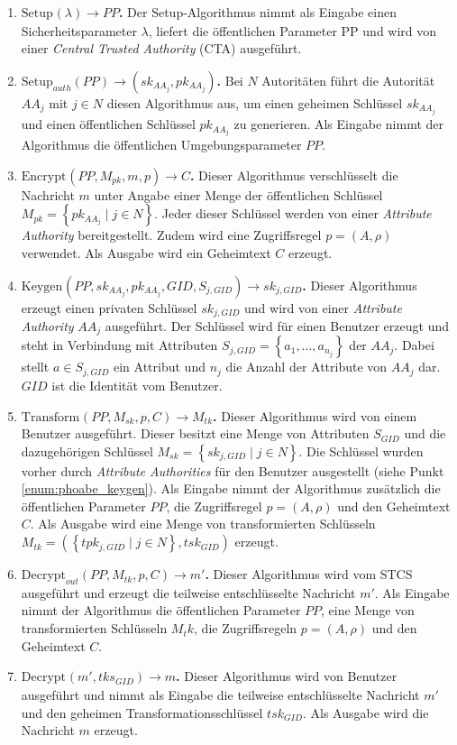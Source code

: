 \documentclass{hsflensburg}
\newcommand{\algitem}[4]{\textbf{$\text{#1}_{#2}\left({#3}\right) \to {#4}$.}\;\;\;\;}
\begin{document}
	\newpage
	\begin{enumerate}
		\item \algitem{Setup}{}{\lambda}{PP} Der
			Setup-Algorithmus nimmt als Eingabe einen Sicherheitsparameter $\lambda$,
			liefert die öffentlichen Parameter $\text{PP}$ und wird von einer
			\textit{Central Trusted Authority} (CTA) ausgeführt.
		\item \algitem{Setup}{auth}{PP}{\left(sk_{AA_j}, pk_{AA_j}\right)} Bei $N$
			Autoritäten führt die Autorität $AA_j$ mit $j \in N$ diesen Algorithmus
			aus, um einen geheimen Schlüssel $sk_{AA_j}$ und einen öffentlichen
			Schlüssel $pk_{AA_j}$ zu generieren. Als Eingabe nimmt der Algorithmus die
			öffentlichen Umgebungsparameter $PP$.
		\item \algitem{Encrypt}{}{PP, M_{pk}, m, p}{C} Dieser Algorithmus
			ver\-schlüs\-selt die Nachricht $m$ unter Angabe einer Menge der
			öffent\-lich\-en Schlüssel $M_{pk} = \left\{ pk_{AA_j} \;\vert\; j \in N
			\right\}$. Jeder dieser Schlüssel werden von einer \textit{Attribute
			Authority} bereitgestellt. Zudem wird eine Zugriffsregel $p = \left( A,
			\rho \right)$ verwendet. Als Ausgabe wird ein Geheimtext $C$ erzeugt.
		\item\label{enum:phoabe_keygen} \algitem{Keygen}{}{PP, sk_{AA_j}, pk_{AA_j},
			GID, S_{j, GID}}{sk_{j, GID}} Dieser Algorithmus erzeugt einen privaten
			Schlüssel $sk_{j, GID}$ und wird von einer \textit{Attribute Authority}
			$AA_j$ ausgeführt. Der Schlüssel wird für einen Benutzer erzeugt und steht
			in Verbindung mit Attributen $S_{j, GID} = \left\{ a_1, ..., a_{n_j}
			\right\}$ der $AA_j$.  Dabei stellt $a \in S_{j, GID}$ ein Attribut und
			$n_j$ die Anzahl der Attribute von $AA_j$ dar. $GID$ ist die Identität vom
			Benutzer.
		\item \algitem{Transform}{}{PP, M_{sk}, p, C}{M_{tk}} Dieser Algorithmus
			wird von einem Benutzer ausgeführt. Dieser besitzt eine Menge von
			Attributen $S_{GID}$ und die dazugehörigen Schlüssel $M_{sk} = \left\{
			sk_{j, GID} \;\vert\; j \in N \right\}$. Die Schlüssel wurden vorher durch
			\textit{Attribute Authorities} für den Benutzer ausgestellt (siehe Punkt
			\ref{enum:phoabe_keygen}). Als Eingabe nimmt der Algorithmus zusätzlich
			die öffentlichen Parameter $PP$, die Zugriffsregel $p = \left(A,
			\rho\right)$ und den Geheimtext $C$. Als Ausgabe wird eine Menge von
			transformierten Schlüsseln $M_{tk} = \left( \left\{tpk_{j, GID} \;\vert\;
			j \in N\right\}, tsk_{GID} \right)$ erzeugt.
		\item \algitem{Decrypt}{out}{PP, M_{tk}, p, C}{m'} Dieser Algorithmus wird
			vom STCS ausgeführt und erzeugt die teilweise entschlüsselte Nachricht
			$m'$. Als Eingabe nimmt der Algorithmus die öffentlichen Parameter $PP$,
			eine Menge von transformierten Schlüsseln $M_tk$, die Zugriffsregeln $p =
			\left(A, \rho\right)$ und den Geheimtext $C$.
		\item \algitem{Decrypt}{}{m', tks_{GID}}{m} Dieser Algorithmus wird von
			Benutzer ausgeführt und nimmt als Eingabe die teilweise entschlüsselte
			Nachricht $m'$ und den geheimen Transformationsschlüssel $tsk_{GID}$. Als
			Ausgabe wird die Nachricht $m$ erzeugt.
	\end{enumerate}

	\newpage
	
	
\end{document}
